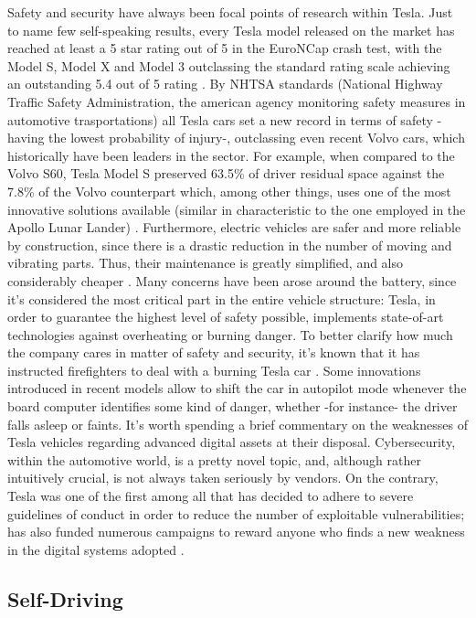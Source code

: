 Safety and security have always been focal points of research within Tesla. Just to name few self-speaking results, every Tesla model released on the market has reached at least a 5 star rating out of 5 in the EuroNCap crash test, with the Model S, Model X and Model 3 outclassing the standard rating scale achieving an outstanding 5.4 out of 5 rating \cite{model_s_rating}.
By NHTSA standards (National Highway Traffic Safety Administration, the american agency monitoring safety measures in automotive trasportations) all Tesla cars set a new record in terms of safety -having the lowest probability of injury-, outclassing even recent Volvo cars, which historically have been leaders in the sector. For example, when compared to the Volvo S60, Tesla Model S preserved 63.5\% of driver residual space against the 7.8\% of the Volvo counterpart which, among other things, uses one of the most innovative solutions available (similar in characteristic to the one employed in the Apollo Lunar Lander) \cite{model_s_rating}.
Furthermore, electric vehicles are safer and more reliable by construction, since there is a drastic reduction in the number of moving and vibrating parts. Thus, their maintenance is greatly simplified, and also considerably cheaper \cite{aboutTesla}. Many concerns have been arose around the battery, since it's considered the most critical part in the entire vehicle structure: Tesla, in order to guarantee the highest level of safety possible, implements state-of-art technologies against overheating or burning danger. To better clarify how much the company cares in matter of safety and security, it's known that it has instructed firefighters to deal with a burning Tesla car \cite{tesla_training_fire}. Some innovations introduced in recent models allow to shift the car in autopilot mode whenever the board computer identifies some kind of danger, whether -for instance- the driver falls asleep or faints.
It's worth spending a brief commentary on the weaknesses of Tesla vehicles regarding advanced digital assets at their disposal. Cybersecurity, within the automotive world, is a pretty novel topic, and, although rather intuitively crucial, is not always taken seriously by vendors. On the contrary, Tesla was one of the first among all that has decided to adhere to severe guidelines of conduct in order to reduce the number of exploitable vulnerabilities; has also funded numerous campaigns to reward anyone who finds a new weakness in the digital systems adopted \cite{tesla_security_methods}.

\subsection{Self-Driving}

